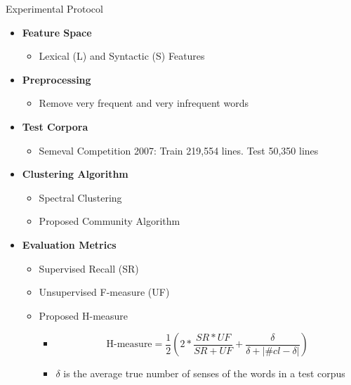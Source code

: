 \documentclass[10pt,=table]{beamer}
\begin{document}
\begin{frame}{Experimental Protocol}
	\begin{itemize}
		\item<1-> \textbf{Feature Space}
			\begin{itemize}
			\item Lexical (L) and Syntactic (S) Features
			\end{itemize}
		
	
		\item<1-> \textbf{Preprocessing}
			\begin{itemize}
				\item<1-> Remove very frequent and very infrequent words
			\end{itemize}
		\item<2-> \textbf{Test Corpora}
			\begin{itemize}
			\item<2-> Semeval Competition 2007: Train 219,554 lines. Test 50,350 lines
			\end{itemize}
		\item<3-> \textbf{Clustering Algorithm}
			\begin{itemize}
				\item<3-> Spectral Clustering 
				\item<3-> Proposed Community Algorithm
			\end{itemize}

		\item<4-> \textbf{Evaluation Metrics}
			\begin{itemize}
				\item<4-> Supervised Recall (SR)
				\item<4-> Unsupervised  F-measure (UF)
				\item<5-> \textcolor{orangeEric}{Proposed H-measure}
				\begin{itemize}
				\item<5->[] 
					\begin{equation*}
					\text{H-measure} = \dfrac{1}{2}\left(2*\dfrac{SR*UF}{SR+UF}+\dfrac{\delta}{\delta+|\#cl-\delta|}\right)
					\end{equation*}
				\item<5->[] \small $\delta$ is the average true number of senses of the words in a test corpus

				\end{itemize}
			\end{itemize}
	\end{itemize}	 
	\vspace{\textheight}
\end{frame}
\end{document}

